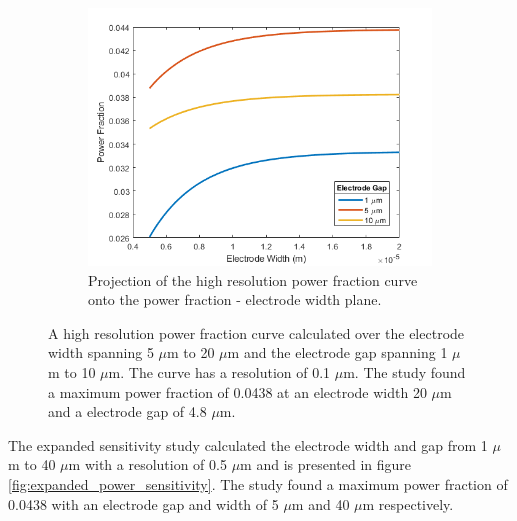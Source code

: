 \begin{figure}[h]
\begin{subfigure}[b]{0.49\textwidth}
    \end{subfigure}
    \hfill
    \begin{subfigure}[b]{0.49\textwidth}
        \centering
        \includegraphics[width=\textwidth]{images/hiResPowerVsWidth.png}
        \caption{Projection of the high resolution power fraction curve onto the power fraction - electrode width plane.}
    \end{subfigure}
    \caption[Analytic Sensitivity]{A high resolution power fraction curve calculated over the electrode width spanning 5 $\mu$m to 20 $\mu$m and the electrode gap spanning 1 $\mu$m to 10 $\mu$m. The curve has a resolution of 0.1 $\mu$m. The study found a maximum power fraction of 0.0438 at an electrode width 20 $\mu$m and a electrode gap of 4.8 $\mu$m.}
    \label{fig:high_resolution_power_fraction}
\end{figure}

\par The expanded sensitivity study calculated the electrode width and gap from 1 $\mu$m to 40 $\mu$m with a resolution of 0.5 $\mu$m and is presented in figure \ref{fig:expanded_power_sensitivity}. The study found a maximum power fraction of 0.0438 with an electrode gap and width of 5 $\mu$m and 40 $\mu$m respectively.  


